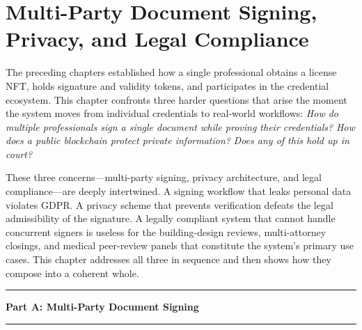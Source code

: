 
\chapter{Multi-Party Document Signing, Privacy, and Legal Compliance}
\label{ch:signing-privacy-legal}

The preceding chapters established how a single professional obtains a license
NFT, holds signature and validity tokens, and participates in the credential
ecosystem.  This chapter confronts three harder questions that arise the moment
the system moves from individual credentials to real-world workflows:
\emph{How do multiple professionals sign a single document while proving their
credentials?}  \emph{How does a public blockchain protect private information?}
\emph{Does any of this hold up in court?}

These three concerns---multi-party signing, privacy architecture, and legal
compliance---are deeply intertwined.  A signing workflow that leaks personal
data violates GDPR.  A privacy scheme that prevents verification defeats the
legal admissibility of the signature.  A legally compliant system that cannot
handle concurrent signers is useless for the building-design reviews,
multi-attorney closings, and medical peer-review panels that constitute the
system's primary use cases.  This chapter addresses all three in sequence and
then shows how they compose into a coherent whole.




\vspace{0.5cm}
\noindent\rule{\textwidth}{1.2pt}
\begin{center}
  {\Large\sffamily\bfseries Part A: Multi-Party Document Signing}
\end{center}
\noindent\rule{\textwidth}{1.2pt}
\vspace{0.3cm}


